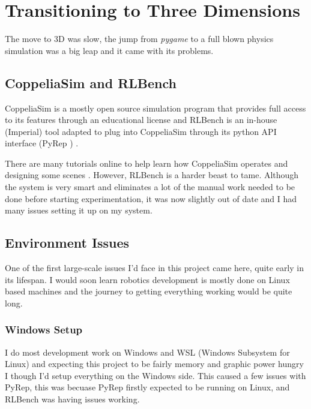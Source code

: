 \section{Transitioning to Three Dimensions}
The move to 3D was slow, the jump from \emph{pygame} to a full blown physics simulation was a big leap and it came with its problems.

\subsection{CoppeliaSim and RLBench}

CoppeliaSim is a mostly open source simulation program that provides full access to its features through an educational license and RLBench is an in-house (Imperial) tool adapted to plug into CoppeliaSim through its python API interface (PyRep \cite{}) . 

There are many tutorials online to help learn how CoppeliaSim operates and designing some scenes . However, RLBench is a harder beast to tame. Although the system is very smart and eliminates a lot of the manual work needed to be done before starting experimentation, it was now slightly out of date and I had many issues setting it up on my system.

\subsection{Environment Issues}
One of the first large-scale issues I'd face in this project came here, quite early in its lifespan. I would soon learn robotics development is mostly done on Linux based machines and the journey to getting everything working would be quite long.

\subsubsection{Windows Setup}
I do most development work on Windows and WSL (Windows Subsystem for Linux) \cite{} and expecting this project to be fairly memory and graphic power hungry I though I'd setup everything on the Windows side. This caused a few issues with PyRep, this was becuase PyRep firstly expected to be running on Linux, and RLBench was having issues working.

